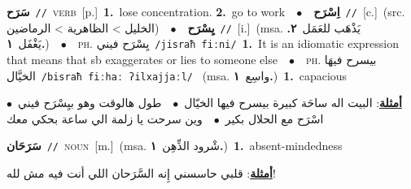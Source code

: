 \documentclass[10pt,a4paper,twoside]{article} %
\begin{document}
\begin{multicols}{2}
{\setlength\topsep{0pt}\textbf{\foreignlanguage{arabic}{سَرَح}}\ {\color{gray}\texttt{//}\color{black}}\ \textsc{verb}\ [p.]\ \textbf{1.}~lose concentration.  \textbf{2.}~go to work\ \ $\bullet$\ \ \setlength\topsep{0pt}\textbf{\foreignlanguage{arabic}{اِسْرَح}}\ {\color{gray}\texttt{//}\color{black}}\ [c.]\ (src. \color{gray}\foreignlanguage{arabic}{الخليل > الظاهرية > الرماضين}\color{black})\ \ $\bullet$\ \ \setlength\topsep{0pt}\textbf{\foreignlanguage{arabic}{يِسْرَح}}\ {\color{gray}\texttt{//}\color{black}}\ [i.]\ \color{gray}(msa. \foreignlanguage{arabic}{يَذْهَب للعَمَل}~\foreignlanguage{arabic}{\textbf{٢.}}  \foreignlanguage{arabic}{يَغْفَل}~\foreignlanguage{arabic}{\textbf{١.}})\color{black}\ \ $\bullet$\ \ \textsc{ph.} \color{gray} \foreignlanguage{arabic}{يِسْرَح فيني}\color{black}\ {\color{gray}\texttt{/{\sffamily jisraħ fiːni}/}\color{black}}\ \textbf{1.}~It is an idiomatic expression that means that sb exaggerates or lies to someone else\ \ $\bullet$\ \ \textsc{ph.} \color{gray} \foreignlanguage{arabic}{بيسرح فيهَا الخيَّال}\color{black}\ {\color{gray}\texttt{/{\sffamily bisraħ fiːhaː ʔilxajjaːl}/}\color{black}}\ \color{gray} (msa. \foreignlanguage{arabic}{واسِع}~\foreignlanguage{arabic}{\textbf{١.}})\color{black}\ \textbf{1.}~capacious\  \begin{flushright}\color{gray}\foreignlanguage{arabic}{\textbf{\underline{\foreignlanguage{arabic}{أمثلة}}}: البيت اله ساحَة كبيرة بيسرح فيها الخيّال\ $\bullet$\ \  طول هالوقت وهو بيِسْرَح فيني\ $\bullet$\ \  اسْرَح مع الحلال بكير\ $\bullet$\ \  وين سرحت يا زلمة الي ساعة بحكي معك}\end{flushright}\color{black}} \vspace{2mm}

{\setlength\topsep{0pt}\textbf{\foreignlanguage{arabic}{سَرَحَان}}\ {\color{gray}\texttt{//}\color{black}}\ \textsc{noun}\ [m.]\ \color{gray}(msa. \foreignlanguage{arabic}{شْرود الذِّهِن}~\foreignlanguage{arabic}{\textbf{١.}})\color{black}\ \textbf{1.}~absent-mindedness\  \begin{flushright}\color{gray}\foreignlanguage{arabic}{\textbf{\underline{\foreignlanguage{arabic}{أمثلة}}}: قلبي حاسسني إِنه السَّرَحان اللي أنت فيه مش لله!}\end{flushright}\color{black}} \vspace{2mm}


\end{multicols}
\end{document}
